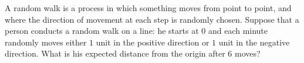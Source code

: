 A random walk is a process in which something moves from point to point, and where the direction of movement at each step is randomly chosen. Suppose that a person conducts a random walk on a line: he starts at $0$ and each minute randomly moves either $1$ unit in the positive direction or $1$ unit in the negative direction. What is his expected distance from the origin after $6$ moves?